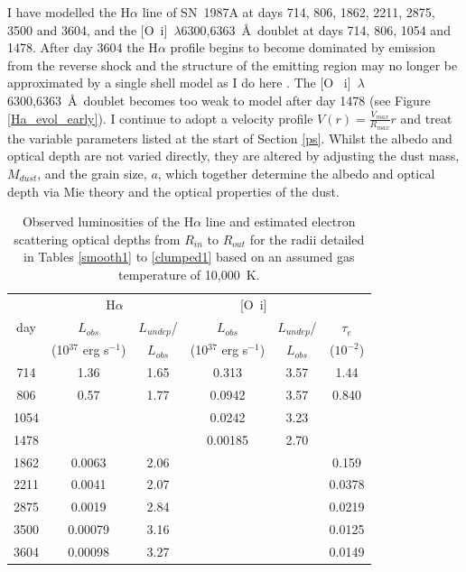 I have modelled the H$\alpha$ line of SN~1987A at days 714, 806, 1862, 
2211, 2875, 3500 and 3604, and the [O~{\sc i}]~$\lambda$6300,6363~\AA\ 
doublet at days 714, 806, 1054 and 1478.  After day 3604 the H$\alpha$ 
profile begins to become dominated by emission from the reverse shock and 
the structure of the emitting region may no longer be approximated by a 
single shell model as I do here \citep{Fransson2013}.  The [O~{\sc 
i}]~$\lambda$6300,6363~\AA\ doublet becomes too weak to model after day 
1478 (see Figure \ref{Ha_evol_early}).  I continue to adopt a velocity 
profile $V(r) = \frac{V_{max}}{R_{max}}r$ and treat the variable 
parameters listed at the start of Section \ref{ps}.  Whilst the albedo and 
optical depth are not varied directly, they are altered by adjusting the 
dust mass, $M_{dust}$, and the grain size, $a$, which together determine 
the albedo and optical depth via Mie theory and the optical properties of 
the dust.

\setlength{\tabcolsep}{10pt}
\begin{table}
\caption{Observed luminosities of the H$\alpha$ line and estimated 
electron scattering optical depths from $R_{in}$ to $R_{out}$ for the 
radii detailed in Tables \ref{smooth1} to \ref{clumped1} based on an 
assumed gas temperature of 10,000~K.}
\centering
\begin{tabular}{@{}cccccc@{}}
\hline
& \multicolumn{2}{c}{H$\alpha$} &  \multicolumn{2}{c}{[O~{\sc i}]}  \\
day &  $L_{obs}$ & $L_{undep}$/  &  $L_{obs}$ & $L_{undep}$/   & $\tau_e$ \\
& (10$^{37}$ erg s$^{-1}$) &$L_{obs}$& (10$^{37}$ erg s$^{-1}$) & $L_{obs}$& ($10^{-2}$) \\
\hline
714 & 1.36 & 1.65 &0.313&3.57& 1.44  \\
806 & 0.57 & 1.77 &0.0942&3.57& 0.840 \\
1054 &&&0.0242 & 3.23\\
1478 &&& 0.00185&2.70 \\
1862 & 0.0063 & 2.06 &&& 0.159  \\
2211 & 0.0041 & 2.07 &&& 0.0378  \\
2875 & 0.0019 & 2.84 & & &0.0219  \\
3500 & 0.00079 & 3.16 & &&0.0125  \\
3604 & 0.00098 & 3.27 &&&0.0149  \\

\hline
\end{tabular}

\label{tau_e}
\end{table}%
\setlength{\tabcolsep}{8pt}


